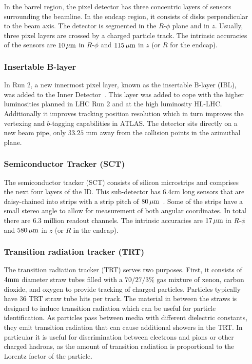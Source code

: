 In the barrel region, the pixel detector has three concentric layers of sensors surrounding the beamline. In the endcap region, it consists of disks perpendicular to the beam axis. The detector is segmented in the $R$-$\phi$ plane and in $z$. Usually, three pixel layers are crossed by a charged particle track. The intrinsic accuracies of the sensors are $10\,\mu\rm m$ in $R$-$\phi$ and $115\,\mu\rm m$ in $z$ (or $R$ for the endcap).


\subsubsection{Insertable B-layer}

In Run 2, a new innermost pixel layer, known as the insertable B-layer (IBL), was added to the Inner Detector~\cite{IBL}. This layer was added to cope with the higher luminosities planned in LHC Run 2 and at the high luminosity HL-LHC. Additionally it improves tracking position resolution which in turn improves the vertexing and $b$-tagging capabilities in ATLAS. The detector sits directly on a new beam pipe, only $33.25 \textrm{ mm}$ away from the collision points in the azimuthal plane. 

\subsubsection{Semiconductor Tracker (SCT)}

The semiconductor tracker (SCT) consists of silicon microstrips and comprises the next four layers of the ID. This sub-detector has $6.4 \textrm{cm}$ long sensors that are daisy-chained into strips with a strip pitch of $80 \,\mu\rm m$~\cite{ATLASPaper}. Some of the strips have a small stereo angle to allow for measurement of both angular coordinates. In total there are $6.3$ million readout channels. The intrinsic accuracies are $17 \,\mu\rm m$ in $R$-$\phi$ and $580 \,\mu\rm m$ in $z$ (or $R$ in the endcap).

\subsubsection{Transition radiation tracker (TRT)}

The transition radiation tracker (TRT) serves two purposes. First, it consists of $4 \rm mm$ diameter straw tubes filled with a $70/27/3$\% gas mixture of xenon, carbon dioxide, and oxygen to provide tracking of charged particles. Particles typically have $36$ TRT straw tube hits per track. The material in between the straws is designed to induce transition radiation which can be useful for particle identification. As particles pass between media with different dielectric constants, they emit transition radiation that can cause additional showers in the TRT. In particular it is useful for discrimination between electrons and pions or other charged hadrons, as the amount of transition radiation is proportional to the Lorentz factor of the particle.

